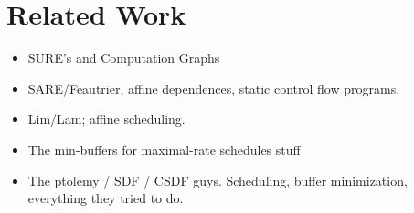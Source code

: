 \section{Related Work}

\begin{itemize}

\item SURE's and Computation Graphs

\item SARE/Feautrier, affine dependences, static control flow programs.

\item Lim/Lam; affine scheduling.

\item The min-buffers for maximal-rate schedules stuff

\item The ptolemy / SDF / CSDF guys.  Scheduling, buffer minimization,
everything they tried to do.

\end{itemize}

